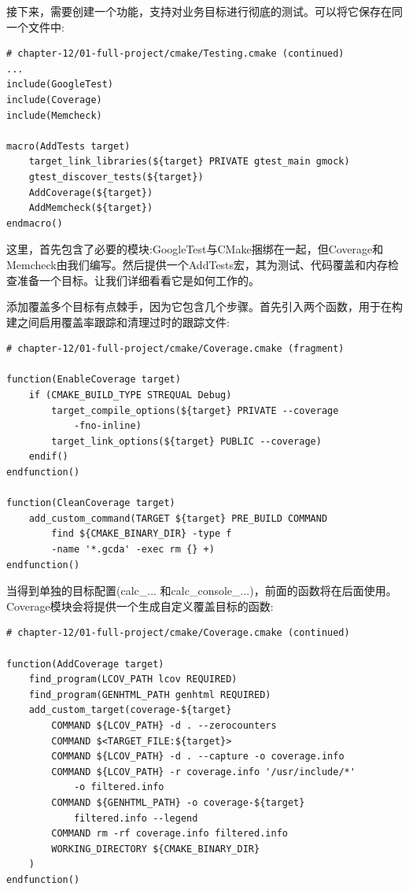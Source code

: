 接下来，需要创建一个功能，支持对业务目标进行彻底的测试。可以将它保存在同一个文件中:

\begin{lstlisting}[style=styleCMake]
# chapter-12/01-full-project/cmake/Testing.cmake (continued)
...
include(GoogleTest)
include(Coverage)
include(Memcheck)

macro(AddTests target)
	target_link_libraries(${target} PRIVATE gtest_main gmock)
	gtest_discover_tests(${target})
	AddCoverage(${target})
	AddMemcheck(${target})
endmacro()
\end{lstlisting}

这里，首先包含了必要的模块:GoogleTest与CMake捆绑在一起，但Coverage和Memcheck由我们编写。然后提供一个AddTests宏，其为测试、代码覆盖和内存检查准备一个目标。让我们详细看看它是如何工作的。


添加覆盖多个目标有点棘手，因为它包含几个步骤。首先引入两个函数，用于在构建之间启用覆盖率跟踪和清理过时的跟踪文件:

\begin{lstlisting}[style=styleCMake]
# chapter-12/01-full-project/cmake/Coverage.cmake (fragment)

function(EnableCoverage target)
	if (CMAKE_BUILD_TYPE STREQUAL Debug)
		target_compile_options(${target} PRIVATE --coverage
			-fno-inline)
		target_link_options(${target} PUBLIC --coverage)
	endif()
endfunction()

function(CleanCoverage target)
	add_custom_command(TARGET ${target} PRE_BUILD COMMAND
		find ${CMAKE_BINARY_DIR} -type f
		-name '*.gcda' -exec rm {} +)
endfunction()
\end{lstlisting}

当得到单独的目标配置(calc\_... 和calc\_console\_...)，前面的函数将在后面使用。Coverage模块会将提供一个生成自定义覆盖目标的函数:

\begin{lstlisting}[style=styleCMake]
# chapter-12/01-full-project/cmake/Coverage.cmake (continued)

function(AddCoverage target)
	find_program(LCOV_PATH lcov REQUIRED)
	find_program(GENHTML_PATH genhtml REQUIRED)
	add_custom_target(coverage-${target}
		COMMAND ${LCOV_PATH} -d . --zerocounters
		COMMAND $<TARGET_FILE:${target}>
		COMMAND ${LCOV_PATH} -d . --capture -o coverage.info
		COMMAND ${LCOV_PATH} -r coverage.info '/usr/include/*'
			-o filtered.info
		COMMAND ${GENHTML_PATH} -o coverage-${target}
			filtered.info --legend
		COMMAND rm -rf coverage.info filtered.info
		WORKING_DIRECTORY ${CMAKE_BINARY_DIR}
	)
endfunction()
\end{lstlisting}

